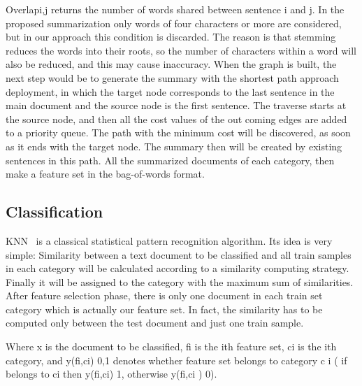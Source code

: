 \documentclass{sigchi}
\begin{document}
Overlapi,j returns the number of words shared between sentence i and j. 
In the proposed summarization only words of four characters or more are considered, but in our approach this condition is discarded. 
The reason is that stemming reduces the words into their roots, so the number of characters within a word will also be reduced, and this may cause inaccuracy.
When the graph is built, the next step would be to generate the summary with the shortest path approach deployment, in which the target node corresponds to the last sentence in the main document and the source node is the first sentence. 
The traverse starts at the source node, and then all the cost values of the out coming edges are added to a priority queue.
The path with the minimum cost will be discovered, as soon as it ends with the target node. 
The summary then will be created by existing sentences in this path. 
All the summarized documents of each category, then make a feature set in the bag-of-words format.

\subsection{Classification}\label{sectionClassification}
KNN~\cite{5190062} is a classical statistical pattern recognition algorithm. 
Its idea is very simple: Similarity between a text document to be classified and all train samples in each category will be calculated according to a similarity computing strategy.
Finally it will be assigned to the category with the maximum sum of similarities.
After feature selection phase, there is only one document in each train set category which is actually our feature set. 
In fact, the similarity has to be computed only between the test document and just one train sample.

Where x is the document to be classified, fi is the ith feature set, ci is the ith category, and y(fi,ci) {0,1} denotes whether feature set belongs to category c i ( if belongs to ci then y(fi,ci) 1, otherwise y(fi,ci ) 0).
\end{document}
